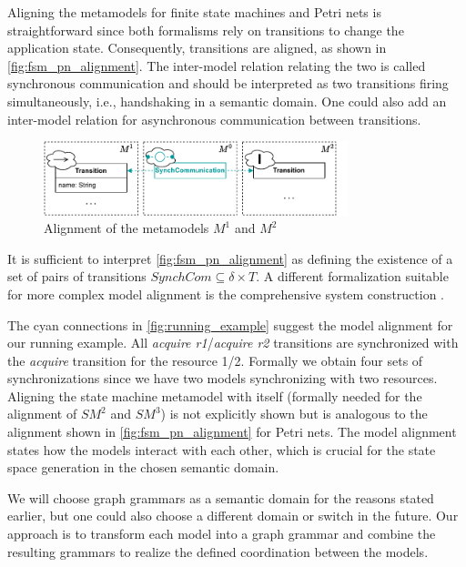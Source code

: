 \documentclass[conference]{IEEEtran}
\begin{document}
Aligning the metamodels for finite state machines and Petri nets is straightforward since both formalisms rely on transitions to change the application state.
Consequently, transitions are aligned, as shown in \autoref{fig:fsm_pn_alignment}.
The inter-model relation relating the two is called synchronous communication and should be interpreted as two transitions firing simultaneously, i.e., handshaking in a semantic domain.
One could also add an inter-model relation for asynchronous communication between transitions.

\begin{figure}[h]
    \centering
    \includegraphics[width=3.48in]{fsm_pn_alignment}
    \caption{Alignment of the metamodels $M^1$ and $M^2$}
    \label{fig:fsm_pn_alignment}
\end{figure}

It is sufficient to interpret \autoref{fig:fsm_pn_alignment} as defining the existence of a set of pairs of transitions $SynchCom \subseteq \delta \times T$.
A different formalization suitable for more complex model alignment is the comprehensive system construction \cite{stunkelMultipleModelSynchronization2020}.

The cyan connections in \autoref{fig:running_example} suggest the model alignment for our running example.
All \textit{acquire r1}/\textit{acquire r2} transitions are synchronized with the \textit{acquire} transition for the resource 1/2.
Formally we obtain four sets of synchronizations since we have two models synchronizing with two resources.
Aligning the state machine metamodel with itself (formally needed for the alignment of $SM^2$ and $SM^3$) is not explicitly shown but is analogous to the alignment shown in \autoref{fig:fsm_pn_alignment} for Petri nets.
The model alignment states how the models interact with each other, which is crucial for the state space generation in the chosen semantic domain.

We will choose graph grammars as a semantic domain for the reasons stated earlier, but one could also choose a different domain or switch in the future.
Our approach is to transform each model into a graph grammar and combine the resulting grammars to realize the defined coordination between the models.
\end{document}
